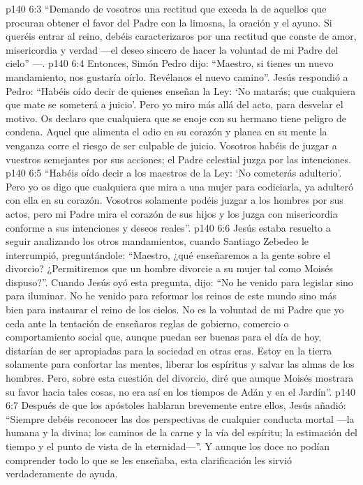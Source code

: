 \vs p140 6:3 “Demando de vosotros una rectitud que exceda la de aquellos que procuran obtener el favor del Padre con la limosna, la oración y el ayuno. Si queréis entrar al reino, debéis caracterizaros por una rectitud que conste de amor, misericordia y verdad ---el deseo sincero de hacer la voluntad de mi Padre del cielo” ---.
\vs p140 6:4 Entonces, Simón Pedro dijo: “Maestro, si tienes un nuevo mandamiento, nos gustaría oírlo. Revélanos el nuevo camino”. Jesús respondió a Pedro: “Habéis oído decir de quienes enseñan la Ley: ‘No matarás; que cualquiera que mate se someterá a juicio’. Pero yo miro más allá del acto, para desvelar el motivo. Os declaro que cualquiera que se enoje con su hermano tiene peligro de condena. Aquel que alimenta el odio en su corazón y planea en su mente la venganza corre el riesgo de ser culpable de juicio. Vosotros habéis de juzgar a vuestros semejantes por sus acciones; el Padre celestial juzga por las intenciones.
\vs p140 6:5 “Habéis oído decir a los maestros de la Ley: ‘No cometerás adulterio’. Pero yo os digo que cualquiera que mira a una mujer para codiciarla, ya adulteró con ella en su corazón. Vosotros solamente podéis juzgar a los hombres por sus actos, pero mi Padre mira el corazón de sus hijos y los juzga con misericordia conforme a sus intenciones y deseos reales”.
\vs p140 6:6 Jesús estaba resuelto a seguir analizando los otros mandamientos, cuando Santiago Zebedeo le interrumpió, preguntándole: “Maestro, ¿qué enseñaremos a la gente sobre el divorcio? ¿Permitiremos que un hombre divorcie a su mujer tal como Moisés dispuso?”. Cuando Jesús oyó esta pregunta, dijo: “No he venido para legislar sino para iluminar. No he venido para reformar los reinos de este mundo sino más bien para instaurar el reino de los cielos. No es la voluntad de mi Padre que yo ceda ante la tentación de enseñaros reglas de gobierno, comercio o comportamiento social que, aunque puedan ser buenas para el día de hoy, distarían de ser apropiadas para la sociedad en otras eras. Estoy en la tierra solamente para confortar las mentes, liberar los espíritus y salvar las almas de los hombres. Pero, sobre esta cuestión del divorcio, diré que aunque Moisés mostrara su favor hacia tales cosas, no era así en los tiempos de Adán y en el Jardín”.
\vs p140 6:7 Después de que los apóstoles hablaran brevemente entre ellos, Jesús añadió: “Siempre debéis reconocer las dos perspectivas de cualquier conducta mortal ---la humana y la divina; los caminos de la carne y la vía del espíritu; la estimación del tiempo y el punto de vista de la eternidad---”. Y aunque los doce no podían comprender todo lo que se les enseñaba, esta clarificación les sirvió verdaderamente de ayuda.
